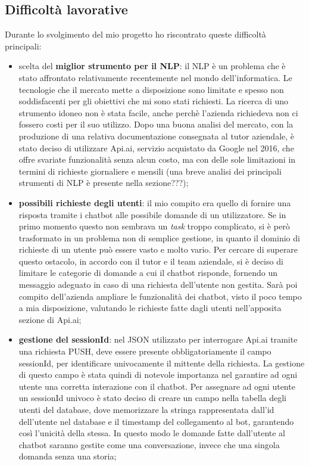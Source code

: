 \subsection{Difficoltà lavorative}
Durante lo svolgimento del mio progetto ho riscontrato queste difficoltà principali:
\begin{itemize}
	\item scelta del \textbf{miglior strumento per il \gls{NLP}}: il \gls{NLP} è un problema che è stato affrontato relativamente recentemente nel mondo dell'informatica. Le tecnologie che il mercato mette a disposizione sono limitate e spesso non soddisfacenti per gli obiettivi che mi sono stati richiesti. La ricerca di uno strumento idoneo non è stata facile, anche perchè l'azienda richiedeva non ci fossero costi per il suo utilizzo. Dopo una buona analisi del mercato, con la produzione di una relativa documentazione consegnata al tutor aziendale, è stato deciso di utilizzare Api.ai, servizio acquistato da Google nel 2016, che offre svariate funzionalità senza alcun costo, ma con delle sole limitazioni in termini di richieste giornaliere e mensili (una breve analisi dei principali strumenti di NLP è presente nella sezione???);
	\item \textbf{possibili richieste degli utenti}: il mio compito era quello di fornire una risposta tramite i \gls{chatbot} alle possibile domande di un utilizzatore. Se in primo momento questo non sembrava un \emph{task} troppo complicato, si è però trasformato in un problema non di semplice gestione, in quanto il dominio di richieste di un utente può essere vasto e molto vario. Per cercare di superare questo ostacolo, in accordo con il tutor e il team aziendale, si è deciso di limitare le categorie di domande a cui il \gls{chatbot} risponde, fornendo un messaggio adeguato in caso di una richiesta dell'utente non gestita. Sarà poi compito dell'azienda ampliare le funzionalità dei \gls{chatbot}, visto il poco tempo a mia disposizione, valutando le richieste fatte dagli utenti nell'apposita sezione di Api.ai;
	\item \textbf{gestione del sessionId}: nel JSON utilizzato per interrogare Api.ai tramite una richiesta PUSH, deve essere presente obbligatoriamente il campo sessionId, per identificare univocamente il mittente della richiesta. La gestione di questo campo è stata quindi di notevole importanza nel garantire ad ogni utente una corretta interazione con il \gls{chatbot}. Per assegnare ad ogni utente un sessionId univoco è stato deciso di creare un campo nella tabella degli utenti del database, dove memorizzare la stringa rappresentata dall'id dell'utente nel database e il timestamp del collegamento al bot, garantendo così l'unicità della stessa. In questo modo le domande fatte dall'utente al \gls{chatbot} saranno gestite come una conversazione, invece che una singola domanda senza una storia;
\end{itemize}


